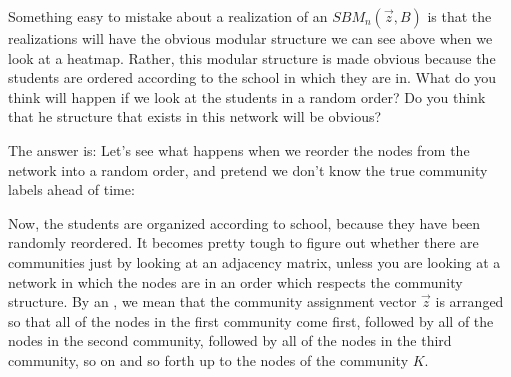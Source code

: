 \documentclass[letterpaper,10pt,english]{jupyterBook}
\begin{document}
\sphinxAtStartPar
Something easy to mistake about a realization of an \(SBM_n(\vec z, B)\) is that the realizations will  have the obvious modular structure we can see above when we look at a heatmap. Rather, this modular structure is  made obvious because the students are ordered according to the school in which they are in. What do you think will happen if we look at the students in a random order? Do you think that he structure that exists in this network will be obvious?

\sphinxAtStartPar
The answer is:  Let’s see what happens when we reorder the nodes from the network into a random order, and pretend we don’t know the true community labels ahead of time:

\begin{sphinxVerbatim}[commandchars=\\\{\}]
   

    

  \PYG{p}{[}\PYG{p}{[}\PYG{p}{]}\PYG{p}{]} \PYG{p}{[}\PYG{p}{]}
  \PYG{p}{[}\PYG{p}{]}
 
\end{sphinxVerbatim}

\noindent{}

\sphinxAtStartPar
Now, the students are  organized according to school, because they have been randomly reordered. It becomes pretty tough to figure out whether there are communities just by looking at an adjacency matrix, unless you are looking at a network in which the nodes are  in an order which respects the community structure. By an , we mean that the community assignment vector \(\vec z\) is arranged so that all of the nodes in the first community come first, followed by all of the nodes in the second community, followed by all of the nodes in the third community, so on and so forth up to the nodes of the community \(K\).
\end{document}
